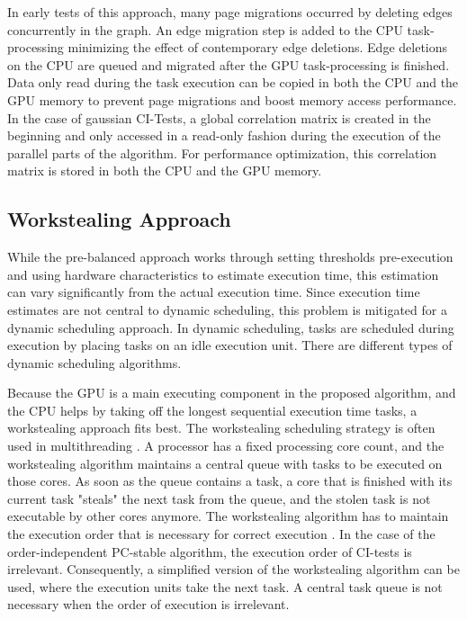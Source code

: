 In early tests of this approach, many page migrations occurred by deleting edges concurrently in the graph. An edge migration step is added to the CPU task-processing minimizing the effect of contemporary edge deletions. Edge deletions on the CPU are queued and migrated after the GPU task-processing is finished.
Data only read during the task execution can be copied in both the CPU and the GPU memory to prevent page migrations and boost memory access performance. In the case of gaussian CI-Tests, a global correlation matrix is created in the beginning and only accessed in a read-only fashion during the execution of the parallel parts of the algorithm. For performance optimization, this correlation matrix is stored in both the CPU and the GPU memory.

\subsection{Workstealing Approach}
While the pre-balanced approach works through setting thresholds pre-execution and using hardware characteristics to estimate execution time, this estimation can vary significantly from the actual execution time. Since execution time estimates are not central to dynamic scheduling, this problem is mitigated for a dynamic scheduling approach. In dynamic scheduling, tasks are scheduled during execution by placing tasks on an idle execution unit. There are different types of dynamic scheduling algorithms.

Because the GPU is a main executing component in the proposed algorithm, and the CPU helps by taking off the longest sequential execution time tasks, a workstealing approach fits best. The workstealing scheduling strategy is often used in multithreading \cite{nemirovskyMultithreadingArchitecture2013}. A processor has a fixed processing core count, and the workstealing algorithm maintains a central queue with tasks to be executed on those cores. As soon as the queue contains a task, a core that is finished with its current task "steals" the next task from the queue, and the stolen task is not executable by other cores anymore. The workstealing algorithm has to maintain the execution order that is necessary for correct execution \cite{blumofeSchedulingMultithreadedComputations1999}.
In the case of the order-independent PC-stable algorithm, the execution order of CI-tests is irrelevant. Consequently, a simplified version of the workstealing algorithm can be used, where the execution units take the next task. A central task queue is not necessary when the order of execution is irrelevant.

